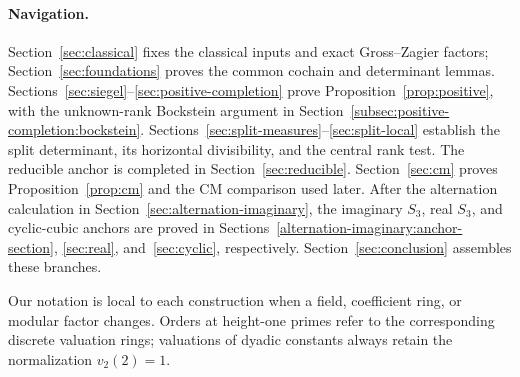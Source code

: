 \paragraph{Navigation.}
Section~\ref{sec:classical} fixes the classical inputs and exact
Gross--Zagier factors; Section~\ref{sec:foundations} proves the common
cochain and determinant lemmas. Sections~\ref{sec:siegel}--\ref{sec:positive-completion}
prove Proposition~\ref{prop:positive}, with the unknown-rank
Bockstein argument in Section~\ref{subsec:positive-completion:bockstein}.
Sections~\ref{sec:split-measures}--\ref{sec:split-local} establish the
split determinant, its horizontal divisibility, and the central rank
test. The reducible anchor is completed in Section~\ref{sec:reducible}.
Section~\ref{sec:cm} proves Proposition~\ref{prop:cm} and the CM
comparison used later. After the alternation calculation in
Section~\ref{sec:alternation-imaginary}, the imaginary \(S_3\), real
\(S_3\), and cyclic-cubic anchors are proved in
Sections~\ref{alternation-imaginary:anchor-section}, \ref{sec:real},
and~\ref{sec:cyclic}, respectively. Section~\ref{sec:conclusion}
assembles these branches.

Our notation is local to each construction when a field, coefficient
ring, or modular factor changes.  Orders at height-one primes refer to
the corresponding discrete valuation rings; valuations of dyadic
constants always retain the normalization \(v_2(2)=1\).
